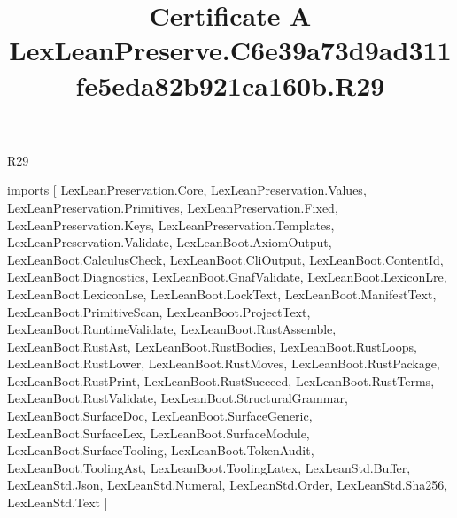 \begin{lexlean}{R29}
\title{Certificate A LexLeanPreserve.C6e39a73d9ad311fe5eda82b921ca160b.R29}
\begin{coremodule}
imports [
  LexLeanPreservation.Core,
  LexLeanPreservation.Values,
  LexLeanPreservation.Primitives,
  LexLeanPreservation.Fixed,
  LexLeanPreservation.Keys,
  LexLeanPreservation.Templates,
  LexLeanPreservation.Validate,
  LexLeanBoot.AxiomOutput,
  LexLeanBoot.CalculusCheck,
  LexLeanBoot.CliOutput,
  LexLeanBoot.ContentId,
  LexLeanBoot.Diagnostics,
  LexLeanBoot.GnafValidate,
  LexLeanBoot.LexiconLre,
  LexLeanBoot.LexiconLse,
  LexLeanBoot.LockText,
  LexLeanBoot.ManifestText,
  LexLeanBoot.PrimitiveScan,
  LexLeanBoot.ProjectText,
  LexLeanBoot.RuntimeValidate,
  LexLeanBoot.RustAssemble,
  LexLeanBoot.RustAst,
  LexLeanBoot.RustBodies,
  LexLeanBoot.RustLoops,
  LexLeanBoot.RustLower,
  LexLeanBoot.RustMoves,
  LexLeanBoot.RustPackage,
  LexLeanBoot.RustPrint,
  LexLeanBoot.RustSucceed,
  LexLeanBoot.RustTerms,
  LexLeanBoot.RustValidate,
  LexLeanBoot.StructuralGrammar,
  LexLeanBoot.SurfaceDoc,
  LexLeanBoot.SurfaceGeneric,
  LexLeanBoot.SurfaceLex,
  LexLeanBoot.SurfaceModule,
  LexLeanBoot.SurfaceTooling,
  LexLeanBoot.TokenAudit,
  LexLeanBoot.ToolingAst,
  LexLeanBoot.ToolingLatex,
  LexLeanStd.Buffer,
  LexLeanStd.Json,
  LexLeanStd.Numeral,
  LexLeanStd.Order,
  LexLeanStd.Sha256,
  LexLeanStd.Text
]


\end{coremodule}
\end{lexlean}
